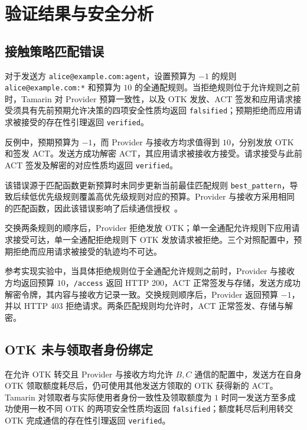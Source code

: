 
\section{验证结果与安全分析}
\label{sec:results}

\subsection{接触策略匹配错误}
\label{subsec:policy-evaluation-consistency}

对于发送方 \nolinkurl{alice@example.com:agent}，设置预算为 $-1$ 的规则 \nolinkurl{alice@example.com:*} 和预算为 $10$ 的全通配规则。当拒绝规则位于允许规则之前时，Tamarin 对 Provider 预算一致性，以及 OTK 发放、ACT 签发和应用请求接受须具有先前预期允许决策的四项安全性质均返回 \texttt{falsified}；预期拒绝而应用请求被接受的存在性引理返回 \texttt{verified}。

反例中，预期预算为 $-1$，而 Provider 与接收方均求值得到 $10$，分别发放 OTK 和签发 ACT。发送方成功解密 ACT，其应用请求被接收方接受。请求接受与此前 ACT 签发及解密的对应性质均返回 \texttt{verified}。

该错误源于匹配函数更新预算时未同步更新当前最佳匹配规则 \texttt{best\_pattern}，导致后续低优先级规则覆盖高优先级规则对应的预算。Provider 与接收方采用相同的匹配函数，因此该错误影响了后续通信授权~\cite{sagaReferenceImpl2026}。

交换两条规则的顺序后，Provider 拒绝发放 OTK；单一全通配允许规则下应用请求接受可达，单一全通配拒绝规则下 OTK 发放请求被拒绝。三个对照配置中，预期拒绝而应用请求被接受的轨迹均不可达。

参考实现实验中，当具体拒绝规则位于全通配允许规则之前时，Provider 与接收方均返回预算 $10$，\texttt{/access} 返回 HTTP 200，ACT 正常签发与存储，发送方成功解密令牌，其内容与接收方记录一致。交换规则顺序后，Provider 返回预算 $-1$，并以 HTTP 403 拒绝请求。两条匹配规则均允许时，ACT 正常签发、存储与解密。

\subsection{OTK 未与领取者身份绑定}
\label{subsec:otk-issuance-use}

在允许 OTK 转交且 Provider 与接收方均允许 $B,C$ 通信的配置中，发送方在自身 OTK 领取额度耗尽后，仍可使用其他发送方领取的 OTK 获得新的 ACT。Tamarin 对领取者与实际使用者身份一致性及领取额度为 $1$ 时同一发送方至多成功使用一枚不同 OTK 的两项安全性质均返回 \texttt{falsified}；额度耗尽后利用转交 OTK 完成通信的存在性引理返回 \texttt{verified}。

